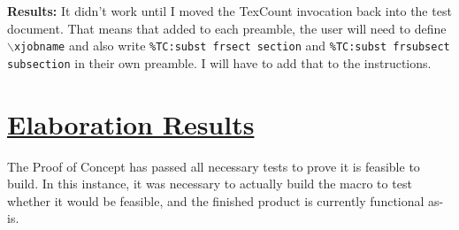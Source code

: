 \documentclass[12pt]{article}
\begin{document}
\textbf{Results:} It didn't work until I moved the TexCount invocation back into the test document. That means that added to each preamble, the user will need to define \texttt{$\backslash$xjobname} and also write \texttt{\%TC:subst frsect section} and \texttt{\%TC:subst frsubsect subsection} in their own preamble. I will have to add that to the instructions.

\section*{\underline{Elaboration Results}}

The Proof of Concept has passed all necessary tests to prove it is feasible to build. In this instance, it was necessary to actually build the macro to test whether it would be feasible, and the finished product is currently functional as-is.
\end{document}
